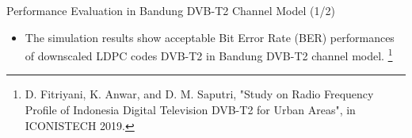\documentclass[11pt, aspectratio=169]{beamer}
\newcommand\blfootnote[1]{%
  \begingroup
  \renewcommand\thefootnote{}\footnote{#1}%
  \addtocounter{footnote}{-1}%
  \endgroup
}
\begin{document}
\begin{frame}{Performance Evaluation in Bandung DVB-T2 Channel Model (1/2)}
\begin{itemize}

		\item The simulation results show acceptable Bit Error Rate (BER) performances of downscaled LDPC codes DVB-T2 in Bandung DVB-T2 channel model.\blfootnote{\tiny{D. Fitriyani, K. Anwar, and D. M. Saputri, "Study on Radio Frequency Profile of Indonesia Digital Television DVB-T2 for Urban Areas", in ICONISTECH 2019.}}
	\end{itemize}
	
\end{frame}
\end{document}
